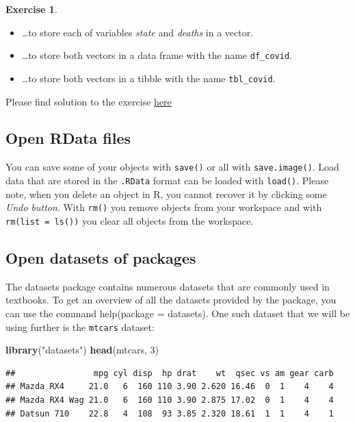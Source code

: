 \documentclass[
  12pt,
  oneside]{book}
\newenvironment{Shaded}{\begin{snugshade}}{\end{snugshade}}
\newcommand{\DecValTok}[1]{\textcolor[rgb]{0.00,0.00,0.81}{#1}}
\newcommand{\FunctionTok}[1]{\textcolor[rgb]{0.13,0.29,0.53}{\textbf{#1}}}
\newcommand{\NormalTok}[1]{#1}
\newcommand{\StringTok}[1]{\textcolor[rgb]{0.31,0.60,0.02}{#1}}
\providecommand{\tightlist}{%
  \setlength{\itemsep}{0pt}\setlength{\parskip}{0pt}}
\theoremstyle{definition}
\theoremstyle{definition}
\theoremstyle{definition}
\newtheorem{exercise}{Exercise}[chapter]
\theoremstyle{definition}
\theoremstyle{remark}
\begin{document}
\begin{exercise}
\begin{itemize}
\tightlist
\item
  \ldots to store each of variables \emph{state} and \emph{deaths} in a vector.
\item
  \ldots to store both vectors in a data frame with the name \texttt{df\_covid}.
\item
  \ldots to store both vectors in a tibble with the name \texttt{tbl\_covid}.
\end{itemize}

Please find solution to the exercise \href{https://raw.githubusercontent.com/hubchev/courses/main/scr/import_covid_data.R}{here}
\end{exercise}

\hypertarget{open-rdata-files}{%
\subsection{Open RData files}\label{open-rdata-files}}

You can save some of your objects with \texttt{save()} or all with \texttt{save.image()}. Load data that are stored in the \texttt{.RData} format can be loaded with \texttt{load()}. Please note, when you delete an object in R, you cannot recover it by clicking some \emph{Undo button}.
With \texttt{rm()} you remove objects from your workspace and with \texttt{rm(list\ =\ ls())} you clear all objects from the workspace.

\hypertarget{open-datasets-of-packages}{%
\subsection{Open datasets of packages}\label{open-datasets-of-packages}}

The datasets package contains numerous datasets that are commonly used in textbooks.
To get an overview of all the datasets provided by the package, you can use the command help(package = datasets).
One such dataset that we will be using further is the \texttt{mtcars} dataset:

\begin{Shaded}
\begin{Highlighting}[]
\FunctionTok{library}\NormalTok{(}\StringTok{"datasets"}\NormalTok{)}
\FunctionTok{head}\NormalTok{(mtcars, }\DecValTok{3}\NormalTok{)}
\end{Highlighting}
\end{Shaded}

\begin{verbatim}
##                mpg cyl disp  hp drat    wt  qsec vs am gear carb
## Mazda RX4     21.0   6  160 110 3.90 2.620 16.46  0  1    4    4
## Mazda RX4 Wag 21.0   6  160 110 3.90 2.875 17.02  0  1    4    4
## Datsun 710    22.8   4  108  93 3.85 2.320 18.61  1  1    4    1
\end{verbatim}
\end{document}

